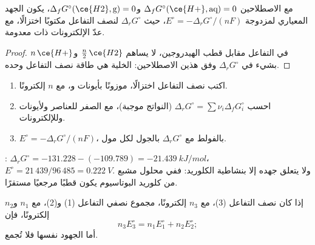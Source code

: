 \begin{proposition}\label{prop:b2:cell-thermodynamics:standard-potential}
مع الاصطلاحين $\Delta_f G^\circ(\ce{H+}, \text{aq}) = 0$ 
و$\Delta_f G^\circ(\ce{H2}, \text{g}) = 0$، يكون الجهد المعياري لمزدوجة
$E^\circ = -\Delta_r G^\circ/(nF)$، حيث $\Delta_r G^\circ$ 
لنصف التفاعل مكتوبًا اختزالًا، مع عدّ الإلكترونات ذات 
معدومة.
\end{proposition}

\begin{proof}
في التفاعل مقابل قطب الهيدروجين، لا يساهم $\tfrac n2\,\ce{H2}$ 
و$n\,\ce{H+}$ بشيء في $\Delta_r G^\circ$ وفق هذين الاصطلاحين:  الخلية هي طاقة نصف التفاعل وحده.
\end{proof}

\begin{method}\label{met:b2:cell-thermodynamics:e-from-gibbs}
\begin{enumerate}
  \item اكتب نصف التفاعل اختزالًا، موزونًا بأيونات  
        و، مع $n$ إلكترونًا.
  \item احسب $\Delta_r G^\circ = \sum\nu_i\Delta_f G^\circ_i$ (النواتج
        موجبة)، مع الصفر للعناصر ولأيونات  وللإلكترونات.
  \item $E^\circ = -\Delta_r G^\circ/(nF)$، بالفولط مع $\Delta_r G^\circ$
        بالجول لكل مول.
\end{enumerate}
\end{method}

\begin{example}\label{ex:b2:cell-thermodynamics:agcl}
: $\Delta_r G^\circ = -131.228 - (-109.789) =
\qty{-21.439}{kJ/mol}$، $E^\circ = 21\,439/96\,485 = \qty{0.222}{V}$. ولا يتعلق جهده
إلا بنشاطية الكلوريد: ففي محلول مشبع من كلوريد البوتاسيوم يكون
قطبًا مرجعيًا مستقرًا.
\end{example}

\begin{proposition}\label{prop:b2:cell-thermodynamics:combining}
إذا كان نصف التفاعل (3)، مع $n_3$ إلكترونًا، مجموع نصفي التفاعل (1)
و(2)، مع $n_1$ و$n_2$ إلكترونًا، فإن
\[
  n_3E_3^\circ = n_1E_1^\circ + n_2E_2^\circ ;
\]
أما الجهود نفسها فلا تُجمع.
\end{proposition}

